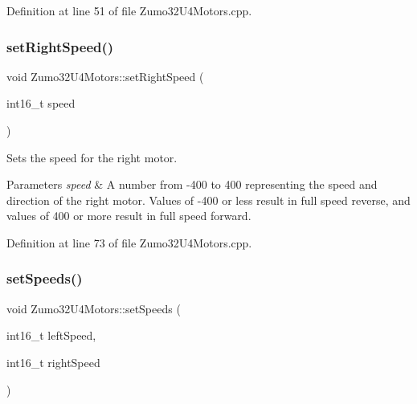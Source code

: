 Definition at line 51 of file Zumo32\+U4\+Motors.\+cpp.

\mbox{\label{class_zumo32_u4_motors_a453fe0d34efe64fc44b7021878730534}} 
\subsubsection{\texorpdfstring{set\+Right\+Speed()}{setRightSpeed()}}
{\footnotesize\ttfamily void Zumo32\+U4\+Motors\+::set\+Right\+Speed (\begin{DoxyParamCaption}\item[{int16\+\_\+t}]{speed }\end{DoxyParamCaption})\hspace{0.3cm}{\ttfamily [static]}}



Sets the speed for the right motor. 


\begin{DoxyParams}{Parameters}
{\em speed} & A number from -\/400 to 400 representing the speed and direction of the right motor. Values of -\/400 or less result in full speed reverse, and values of 400 or more result in full speed forward. \\
\hline
\end{DoxyParams}


Definition at line 73 of file Zumo32\+U4\+Motors.\+cpp.

\mbox{\label{class_zumo32_u4_motors_afdc238f045d9c919afd01f143f2fdbbb}} 
\subsubsection{\texorpdfstring{set\+Speeds()}{setSpeeds()}}
{\footnotesize\ttfamily void Zumo32\+U4\+Motors\+::set\+Speeds (\begin{DoxyParamCaption}\item[{int16\+\_\+t}]{left\+Speed,  }\item[{int16\+\_\+t}]{right\+Speed }\end{DoxyParamCaption})\hspace{0.3cm}{\ttfamily [static]}}



